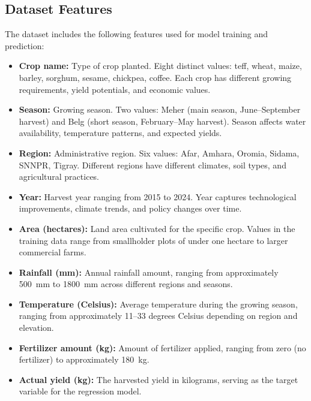 \subsection{Dataset Features}

The dataset includes the following features used for model training and prediction:

\begin{itemize}
  \item \textbf{Crop name:} Type of crop planted. Eight distinct values: teff, wheat, maize, barley, sorghum, sesame, chickpea, coffee. Each crop has different growing requirements, yield potentials, and economic values.
  
  \item \textbf{Season:} Growing season. Two values: Meher (main season, June--September harvest) and Belg (short season, February--May harvest). Season affects water availability, temperature patterns, and expected yields.
  
  \item \textbf{Region:} Administrative region. Six values: Afar, Amhara, Oromia, Sidama, SNNPR, Tigray. Different regions have different climates, soil types, and agricultural practices.
  
  \item \textbf{Year:} Harvest year ranging from 2015 to 2024. Year captures technological improvements, climate trends, and policy changes over time.
  
  \item \textbf{Area (hectares):} Land area cultivated for the specific crop. Values in the training data range from smallholder plots of under one hectare to larger commercial farms.
  
  \item \textbf{Rainfall (mm):} Annual rainfall amount, ranging from approximately 500~mm to 1800~mm across different regions and seasons.
  
  \item \textbf{Temperature (Celsius):} Average temperature during the growing season, ranging from approximately 11--33 degrees Celsius depending on region and elevation.
  
  \item \textbf{Fertilizer amount (kg):} Amount of fertilizer applied, ranging from zero (no fertilizer) to approximately 180~kg.
  
  \item \textbf{Actual yield (kg):} The harvested yield in kilograms, serving as the target variable for the regression model.
\end{itemize}

